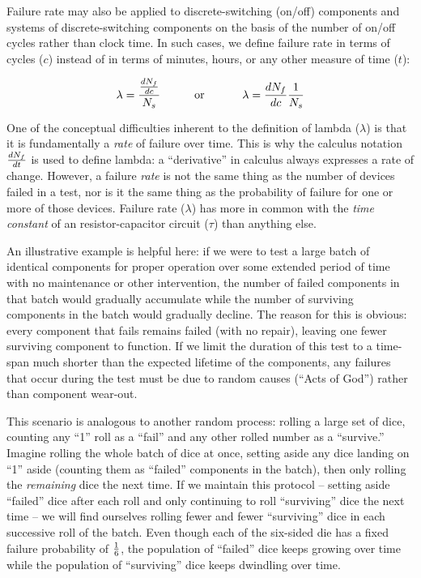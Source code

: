 \vskip 10pt

Failure rate may also be applied to discrete-switching (on/off) components and systems of discrete-switching components on the basis of the number of on/off cycles rather than clock time.  In such cases, we define failure rate in terms of cycles ($c$) instead of in terms of minutes, hours, or any other measure of time ($t$):

$$\lambda = {{dN_f \over dc} \over N_s} \hbox{\hskip 30pt or \hskip 30pt} \lambda = {{dN_f \over dc} {1 \over N_s}}$$

One of the conceptual difficulties inherent to the definition of lambda ($\lambda$) is that it is fundamentally a \textit{rate} of failure over time.  This is why the calculus notation $dN_f \over dt$ is used to define lambda: a ``derivative'' in calculus always expresses a rate of change.  However, a failure \textit{rate} is not the same thing as the number of devices failed in a test, nor is it the same thing as the probability of failure for one or more of those devices.  Failure rate ($\lambda$) has more in common with the \textit{time constant} of an resistor-capacitor circuit ($\tau$) than anything else.

\filbreak

An illustrative example is helpful here: if we were to test a large batch of identical components for proper operation over some extended period of time with no maintenance or other intervention, the number of failed components in that batch would gradually accumulate while the number of surviving components in the batch would gradually decline.  The reason for this is obvious: every component that fails remains failed (with no repair), leaving one fewer surviving component to function.  If we limit the duration of this test to a time-span much shorter than the expected lifetime of the components, any failures that occur during the test must be due to random causes (``Acts of God'') rather than component wear-out.  

This scenario is analogous to another random process: rolling a large set of dice, counting any ``1'' roll as a ``fail'' and any other rolled number as a ``survive.''  Imagine rolling the whole batch of dice at once, setting aside any dice landing on ``1'' aside (counting them as ``failed'' components in the batch), then only rolling the \textit{remaining} dice the next time.  If we maintain this protocol -- setting aside ``failed'' dice after each roll and only continuing to roll ``surviving'' dice the next time -- we will find ourselves rolling fewer and fewer ``surviving'' dice in each successive roll of the batch.  Even though each of the six-sided die has a fixed failure probability of $1 \over 6$, the population of ``failed'' dice keeps growing over time while the population of ``surviving'' dice keeps dwindling over time.


